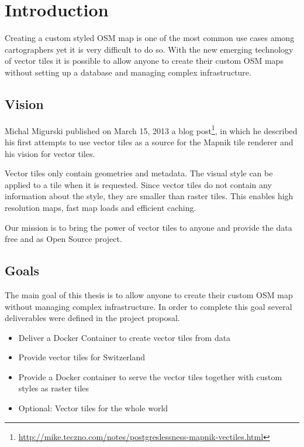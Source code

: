 \chapter{Introduction}


Creating a custom styled OSM map is one of the most common use cases
among cartographers yet it is very difficult to do so. With the new
emerging technology of vector tiles it is possible to allow anyone to
create their custom OSM maps without setting up a database and
managing complex infrastructure.


\section{Vision}\label{vision}

Michal Migurski published on March 15, 2013 a blog
post\footnote{\url{http://mike.teczno.com/notes/postgreslessness-mapnik-vectiles.html}},
in which he described his first attempts to use vector tiles as a source
for the Mapnik tile renderer and his vision for vector tiles.

Vector tiles only contain geometries and metadata. The visual style can
be applied to a tile when it is requested. Since vector tiles do not
contain any information about the style, they are smaller than raster
tiles. This enables high resolution maps, fast map loads and efficient
caching.

Our mission is to bring the power of vector tiles to anyone and provide
the data free and as Open Source project.


\section{Goals}\label{targets}

The main goal of this thesis is to allow anyone to create their custom
OSM map without managing complex infrastructure. In order to complete this goal
several deliverables were defined in the project proposal.

\begin{itemize}
\item
  Deliver a Docker Container to create vector tiles from \osm{} data
\item
  Provide vector tiles for Switzerland
\item
  Provide a Docker container to serve the vector tiles together with
  custom styles as raster tiles
\item
  Optional: Vector tiles for the whole world
\end{itemize}

